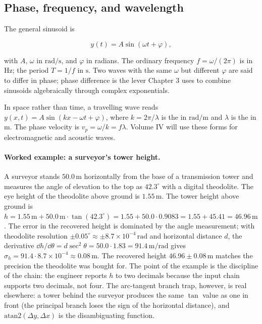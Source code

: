 \subsection{Phase, frequency, and wavelength}

The general sinusoid is

\[
y(t) = A \sin(\omega t + \varphi),
\]

with  $A$,  $\omega$
in $\si{\radian\per\second}$, and  $\varphi$ in
radians. The ordinary frequency $f = \omega/(2\pi)$ is in $\si
{\hertz}$; the period $T = 1/f$ in $\si{\second}$. Two waves with the
same $\omega$ but different $\varphi$ are said to differ in phase;
phase difference is the lever Chapter 3 uses to combine sinusoids
algebraically through complex exponentials.

In space rather than time, a travelling wave reads $y(x, t) = A
\sin(kx - \omega t + \varphi)$, where $k = 2\pi/\lambda$ is the
 in $\si{\radian\per\meter}$ and $\lambda$ is
the  in $\si{\meter}$. The phase velocity is
$v_{p} = \omega/k = f \lambda$. Volume IV will use these forms for
electromagnetic and acoustic waves.

\paragraph{Worked example: a surveyor's tower height.}
A surveyor stands $50.0\,\si{\meter}$ horizontally from the base of
a transmission tower and measures the angle of elevation to the
top as $42.3^{\circ}$ with a digital theodolite. The eye height of
the theodolite above ground is $1.55\,\si{\meter}$. The tower
height above ground is
$h = 1.55\,\si{\meter} + 50.0\,\si{\meter} \cdot \tan(42.3^{\circ})
= 1.55 + 50.0 \cdot 0.9083 = 1.55 + 45.41 = 46.96\,\si{\meter}$.
The error in the recovered height is dominated by the angle
measurement; with theodolite resolution $\pm 0.05^{\circ} \approx
\pm 8.7 \times 10^{-4}\,\si{\radian}$ and horizontal distance
$d$, the derivative $\dd h/\dd \theta = d \sec^{2}\theta = 50.0
\cdot 1.83 = 91.4\,\si{\meter\per\radian}$ gives
$\sigma_{h} = 91.4 \cdot 8.7 \times 10^{-4} \approx 0.08\,\si
{\meter}$. The recovered height $46.96 \pm 0.08\,\si{\meter}$
matches the precision the theodolite was bought for. The point of
the example is the discipline of the chain: the engineer reports
$h$ to two decimals because the input chain supports two decimals,
not four. The arc-tangent branch trap, however, is real elsewhere:
a tower behind the surveyor produces the same $\tan$ value as one
in front (the principal branch loses the sign of the horizontal
distance), and $\mathrm{atan2}(\Delta y, \Delta x)$ is the
disambiguating function.

